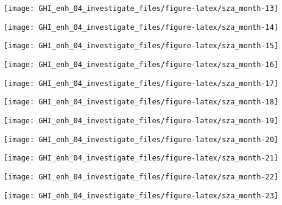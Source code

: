 \documentclass[
  10pt,
  a4paper,oneside]{article}
\begin{document}
\begin{center}\texttt{[image: GHI\_enh\_04\_investigate\_files/figure-latex/sza\_month-13]} \end{center}

\begin{center}\texttt{[image: GHI\_enh\_04\_investigate\_files/figure-latex/sza\_month-14]} \end{center}

\begin{center}\texttt{[image: GHI\_enh\_04\_investigate\_files/figure-latex/sza\_month-15]} \end{center}

\begin{center}\texttt{[image: GHI\_enh\_04\_investigate\_files/figure-latex/sza\_month-16]} \end{center}

\begin{center}\texttt{[image: GHI\_enh\_04\_investigate\_files/figure-latex/sza\_month-17]} \end{center}

\begin{center}\texttt{[image: GHI\_enh\_04\_investigate\_files/figure-latex/sza\_month-18]} \end{center}

\begin{center}\texttt{[image: GHI\_enh\_04\_investigate\_files/figure-latex/sza\_month-19]} \end{center}

\begin{center}\texttt{[image: GHI\_enh\_04\_investigate\_files/figure-latex/sza\_month-20]} \end{center}

\begin{center}\texttt{[image: GHI\_enh\_04\_investigate\_files/figure-latex/sza\_month-21]} \end{center}

\begin{center}\texttt{[image: GHI\_enh\_04\_investigate\_files/figure-latex/sza\_month-22]} \end{center}

\begin{center}\texttt{[image: GHI\_enh\_04\_investigate\_files/figure-latex/sza\_month-23]} \end{center}
\end{document}
